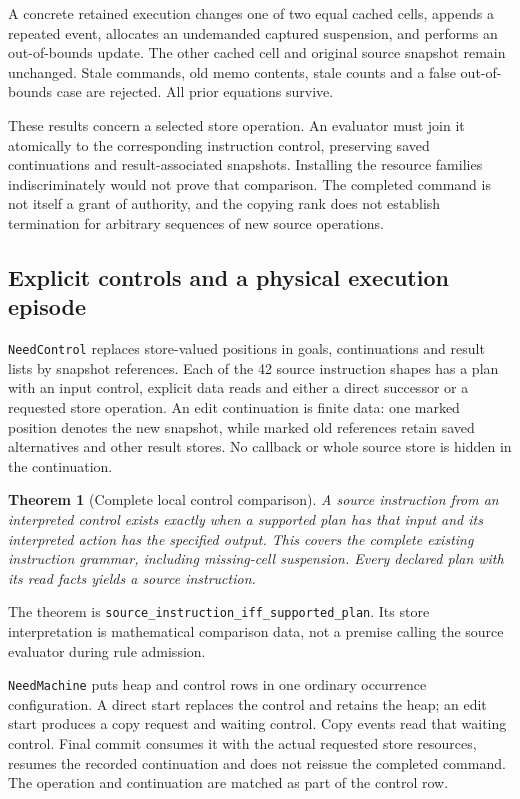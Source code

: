 \documentclass[11pt]{article}
\newtheorem{theorem}{Theorem}
\newcommand{\code}[1]{\texttt{\small #1}}
\begin{document}
A concrete retained execution changes one of two equal cached cells,
appends a repeated event, allocates an undemanded captured suspension, and
performs an out-of-bounds update. The other cached cell and original source
snapshot remain unchanged. Stale commands, old memo contents, stale counts
and a false out-of-bounds case are rejected. All prior equations survive.

These results concern a selected store operation. An evaluator must join
it atomically to the corresponding instruction control, preserving saved
continuations and result-associated snapshots. Installing the resource
families indiscriminately would not prove that comparison. The completed
command is not itself a grant of authority, and the copying rank does not
establish termination for arbitrary sequences of new source operations.

\subsection{Explicit controls and a physical execution episode}

\code{NeedControl} replaces store-valued positions in goals, continuations
and result lists by snapshot references. Each of the 42 source instruction
shapes has a plan with an input control, explicit data reads and either a
direct successor or a requested store operation. An edit continuation is
finite data: one marked position denotes the new snapshot, while marked old
references retain saved alternatives and other result stores. No callback
or whole source store is hidden in the continuation.

\begin{theorem}[Complete local control comparison]
A source instruction from an interpreted control exists exactly when a
supported plan has that input and its interpreted action has the specified
output. This covers the complete existing instruction grammar, including
missing-cell suspension. Every declared plan with its read facts yields a
source instruction.
\end{theorem}
The theorem is \code{source\_instruction\_iff\_supported\_plan}.
Its store interpretation is mathematical comparison data, not a premise
calling the source evaluator during rule admission.

\code{NeedMachine} puts heap and control rows in one ordinary occurrence
configuration. A direct start replaces the control and retains the heap;
an edit start produces a copy request and waiting control. Copy events read
that waiting control. Final commit consumes it with the actual requested
store resources, resumes the recorded continuation and does not reissue
the completed command. The operation and continuation are matched as part
of the control row.
\end{document}
